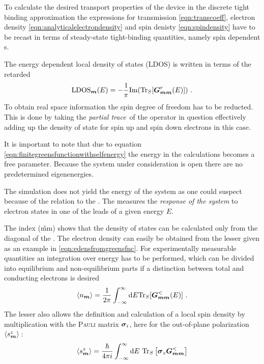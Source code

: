 To calculate the desired transport properties of the device in the discrete tight binding approximation the expressions for transmission \cref{eqn:transcoeff}, electron density \ref{eqn:analyticalelectrondensity} and spin denisty \cref{eqn:spindensity} have to be recast in terms of steady-state tight-binding quantities, namely spin dependent \gfnc s.\par
The energy dependent local density of states (LDOS) is written in terms of the retarded \gfnc{} \cite{AnLunNik2008}
\begin{align}
\text{LDOS}_{\boldsymbol{m}}(E)=-\frac{1}{\pi} \text{Im}(\text{Tr}_S[\boldsymbol{G}_{\boldsymbol{mm}}^r(E)]) \ .
\label{eqn:ldos}
\end{align}
To obtain real space information the spin degree of freedom has to be reducted. This is done by taking the \emph{partial trace}\,\cite{Jacobs} of the operator in question effectively adding up the density of state for spin up and spin down electrons in this case.\par
It is important to note that due to equation \ref{eqn:finitegreensfunctionwithselfenergy} the energy in the calculations becomes a free parameter.  Because the system under consideration is open there are no predetermined eigenenergies.\par
The simulation does not yield the energy of the system as one could suspect because of the relation to the \sdg{}. The \gfnc{} measures the \emph{response of the system} to electron states in one of the leads of a given energy $E$.\par
The index (\v{mm}) shows that the density of states can be calculated only from the diagonal of the \gfnc{}.
The electron density can easily be obtained from the lesser \gfnc{} given as an example in \cref{eqn:edensfromgreensfnc}. For experimentally measurable quantities an integration over energy has to be performed, which can be divided into equilibrium and non-equilibrium parts if a distinction between total and conducting electrons is desired
\begin{align}
	\expv{n_{\v{m}}} = \frac{1}{2\pi} \int_{-\infty}^{\infty}\text{d}E\text{Tr}_S[\mat{G}_{\v{mm}}^<(E)] \ .
	\label{eqn:gfncdensity}
\end{align}
The lesser \gfnc{} also allows the definition and calculation  of a local spin density by multiplication with the \textsc{Pauli} matrix $\boldsymbol{\sigma}_i$, here for the out-of-plane polarization $\left< s^z_{\boldsymbol{m}} \right>$\,\cite{Wimmer2009Thesis}:
\begin{align}
\left< s^z_{\boldsymbol{m}} \right> = \frac{\hbar}{4 \pi i} \int^{\infty}_{-\infty}\text{d}E\text{ Tr}_S\left[\boldsymbol{\sigma}_z\boldsymbol{G}^<_{\boldsymbol{mm}}\right]
\label{eqn:gfncspindensity}
\end{align}
